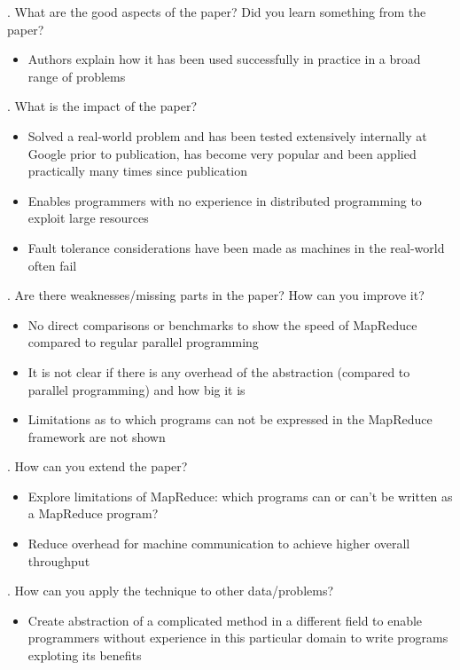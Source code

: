 \documentclass[12pt]{article}
\begin{document}
. What are the good aspects of the paper? Did you learn something from the paper?

\begin{itemize}
    \item Authors explain how it has been used successfully in practice in a broad range of problems
\end{itemize}

. What is the impact of the paper?

\begin{itemize}
    \item Solved a real-world problem and has been tested extensively internally at Google prior to publication, has become very popular and been applied practically many times since publication
    \item Enables programmers with no experience in distributed programming to exploit large resources
    \item Fault tolerance considerations have been made as machines in the real-world often fail
\end{itemize}

. Are there weaknesses/missing parts in the paper? How can you improve it?

\begin{itemize}
    \item No direct comparisons or benchmarks to show the speed of MapReduce compared to regular parallel programming
    \item It is not clear if there is any overhead of the abstraction (compared to parallel programming) and how big it is
    \item Limitations as to which programs can not be expressed in the MapReduce framework are not shown
\end{itemize}

. How can you extend the paper?

\begin{itemize}
    \item Explore limitations of MapReduce: which programs can or can't be written as a MapReduce program?
    \item Reduce overhead for machine communication to achieve higher overall throughput
\end{itemize}

. How can you apply the technique to other data/problems?

\begin{itemize}
    \item Create abstraction of a complicated method in a different field to enable programmers without experience in this particular domain to write programs exploting its benefits
\end{itemize}
\end{document}
